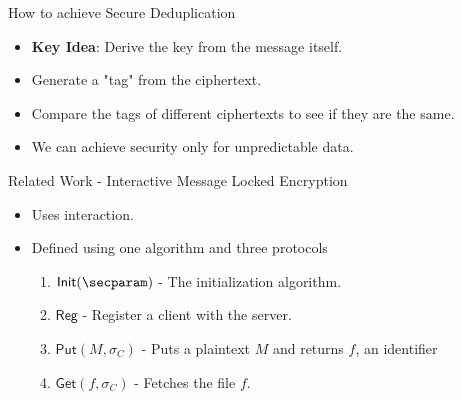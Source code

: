 \documentclass{beamer}
\newcommand{\client}{\sigma_C}
\begin{document}
%
%
\begin{frame}{How to achieve Secure Deduplication}
	\begin{itemize}
		\setlength\itemsep{1em}
		\item \textbf{Key Idea}: Derive the key from the message itself.
		\item Generate a "tag" from the ciphertext.
		\item Compare the tags of different ciphertexts to see if they are the same.
		\item We can achieve security only for unpredictable data.
	\end{itemize}
\end{frame}
%

\begin{frame}{Related Work - Interactive Message Locked Encryption}
	\begin{itemize}
		\setlength\itemsep{1em}
		\item Uses interaction.
		\item Defined using one algorithm and three protocols
		\begin{enumerate}
		    \item $\mathsf{Init}(\secparam)$ - The initialization algorithm.
		    \item $\mathsf{Reg}$ - Register a client with the server.
		    \item $\mathsf{Put}(M, \client)$ - Puts a plaintext $M$ and returns $f$, an identifier
		    \item $\mathsf{Get}(f, \client)$ - Fetches the file $f$.
		\end{enumerate}
	\end{itemize}
\end{frame}
\end{document}
